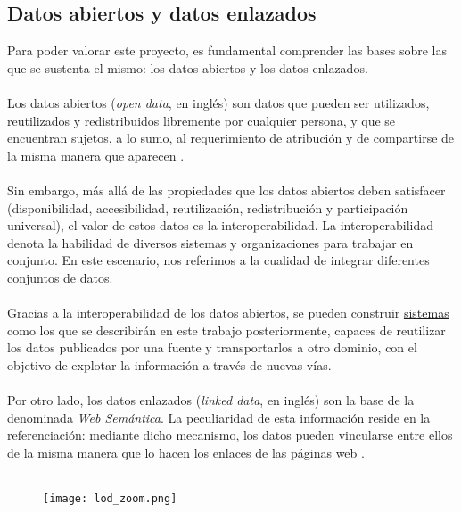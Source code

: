 
    \subsection{Datos abiertos y datos enlazados}
        Para poder valorar este proyecto, es fundamental comprender las bases sobre las que se sustenta el mismo: los datos abiertos y los datos enlazados.
        \\  \\
        Los datos abiertos (\textit{open data}, en inglés) son datos que pueden ser utilizados, reutilizados y redistribuidos libremente por cualquier persona, y que se encuentran sujetos, a lo sumo, al requerimiento de atribución y de compartirse de la misma manera que aparecen \cite{OPENDATA}.
        \\ \\
        Sin embargo, más allá de las propiedades que los datos abiertos deben satisfacer (disponibilidad, accesibilidad, reutilización, redistribución y participación universal), el valor de estos datos es la interoperabilidad. La interoperabilidad denota la habilidad de diversos sistemas y organizaciones para trabajar en conjunto. En este escenario, nos referimos a la cualidad de integrar diferentes conjuntos de datos.
        \\ \\
        Gracias a la interoperabilidad de los datos abiertos, se pueden construir \hyperref[sec:software]{sistemas} como los que se describirán en este trabajo posteriormente, capaces de reutilizar los datos publicados por una fuente y transportarlos a otro dominio, con el objetivo de explotar la información a través de nuevas vías.
        \\ \\
        Por otro lado, los datos enlazados (\textit{linked data}, en inglés) son la base de la denominada \textit{Web Semántica}. La peculiaridad de esta información reside en la referenciación: mediante dicho mecanismo, los datos pueden vincularse entre ellos de la misma manera que lo hacen los enlaces de las páginas web \cite{LINKEDDATA}.
        \\ \\
        
        \begin{figure}[h]
            \centering
            \texttt{[image: lod\_zoom.png]}
            \label{fig:lod}
        \end{figure}
        
